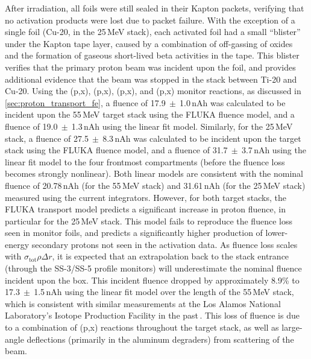 After irradiation, all foils were 
still sealed in their Kapton packets, verifying that no activation products were lost due to packet failure.
With the exception of a single foil (Cu-20, in the 25\,MeV stack), each activated foil had a small \enquote{blister} under the Kapton tape layer, caused by a combination of 
off-gassing of oxides and the formation of gaseous short-lived beta activities in the tape.
This blister   verifies that the primary proton beam was incident upon the foil, and provides additional 
evidence 
that the beam was stopped in the stack between Ti-20 and Cu-20.
Using the (p,x), (p,x), (p,x), and (p,x) monitor reactions, as discussed in \autoref{sec:proton_transport_fe}, a fluence of 17.9$~\pm~$1.0\,nAh 
was calculated to be incident upon the 55\,MeV target stack using the FLUKA fluence model, and a  fluence of 19.0$~\pm~$1.3\,nAh using the linear fit model.
Similarly, for the 25\,MeV stack, a fluence of 27.5$~\pm~$8.3\,nAh 
was calculated to be incident upon the 
target stack using the FLUKA fluence model, and a  fluence of 31.7$~\pm~$3.7\,nAh using the linear fit model to the four frontmost compartments (before the fluence loss becomes strongly nonlinear).
Both linear models are consistent with the nominal fluence of 20.78\,nAh (for the 55\,MeV stack) and 31.61\,nAh (for the 25\,MeV stack) measured using the 
current integrators.
However, for both target stacks, the FLUKA transport model predicts a significant increase in proton fluence, in particular for the 25\,MeV stack.
This model fails to reproduce the fluence loss seen in monitor foils, and predicts a significantly higher production of lower-energy secondary protons not seen in the activation data.
As fluence loss scales with $\sigma_{\mathrm{tot}}\rho\Delta r$, it is expected that an extrapolation back to the stack entrance (through the SS-3/SS-5 profile monitors) will underestimate the nominal fluence incident upon the box.
This incident fluence dropped by approximately 
8.9\% to  17.3$~\pm~$1.5\,nAh using the linear fit model over the length of the 55\,MeV stack, which is consistent with similar measurements at the Los Alamos National Laboratory's Isotope Production Facility in the past\,\cite{Voyles2018a,Graves2016}.
This loss of fluence is due to a combination of 
(p,x) reactions throughout the target stack, as well as large-angle deflections (primarily in the aluminum degraders) from scattering of the beam.




